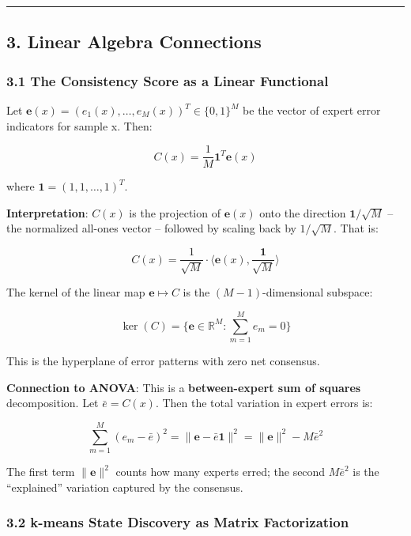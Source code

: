 \documentclass[
  12pt,
]{article}
\begin{document}
\begin{center}\rule{0.5\linewidth}{0.5pt}\end{center}

\subsection{3. Linear Algebra
Connections}\label{linear-algebra-connections}

\subsubsection{3.1 The Consistency Score as a Linear
Functional}\label{the-consistency-score-as-a-linear-functional}

Let \(\mathbf{e}(x) = (e_1(x), \dots, e_M(x))^T \in \{0,1\}^M\) be the
vector of expert error indicators for sample x. Then:

\[C(x) = \frac{1}{M} \mathbf{1}^T \mathbf{e}(x)\]

where \(\mathbf{1} = (1,1,\dots,1)^T\).

\textbf{Interpretation}: \(C(x)\) is the projection of \(\mathbf{e}(x)\)
onto the direction \(\mathbf{1}/\sqrt{M}\) -- the normalized all-ones
vector -- followed by scaling back by \(1/\sqrt{M}\). That is:

\[C(x) = \frac{1}{\sqrt{M}} \cdot \langle \mathbf{e}(x), \frac{\mathbf{1}}{\sqrt{M}} \rangle\]

The kernel of the linear map \(\mathbf{e} \mapsto C\) is the
\((M-1)\)-dimensional subspace:

\[\ker(C) = \{\mathbf{e} \in \mathbb{R}^M : \sum_{m=1}^M e_m = 0\}\]

This is the hyperplane of error patterns with zero net consensus.

\textbf{Connection to ANOVA}: This is a \textbf{between-expert sum of
squares} decomposition. Let \(\bar{e} = C(x)\). Then the total variation
in expert errors is:

\[\sum_{m=1}^M (e_m - \bar{e})^2 = \|\mathbf{e} - \bar{e}\mathbf{1}\|^2 = \|\mathbf{e}\|^2 - M\bar{e}^2\]

The first term \(\|\mathbf{e}\|^2\) counts how many experts erred; the
second \(M\bar{e}^2\) is the ``explained'' variation captured by the
consensus.

\subsubsection{3.2 k-means State Discovery as Matrix
Factorization}\label{k-means-state-discovery-as-matrix-factorization}
\end{document}

